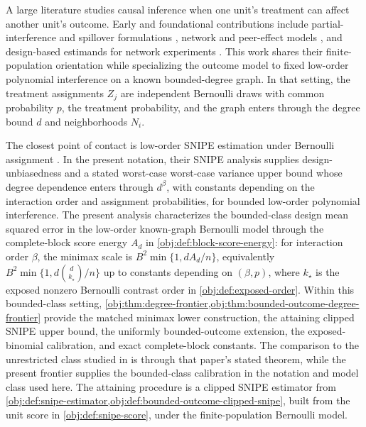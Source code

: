 \documentclass[11pt]{article}
\begin{document}
A large literature studies causal inference when one unit's treatment can affect another unit's outcome. Early and foundational contributions include partial-interference and spillover formulations \citep{Manski1993,Sobel2006,HudgensHalloran2008}, network and peer-effect models \citep{Graham2008,Bramoulle2009,TchetgenTchetgenVanderWeele2012,Manski2013}, and design-based estimands for network experiments \citep{Bowers2013,Ugander2013,vanDerLaan2014,Liu2016,Aronow2017,Eckles2017,Ogburn2017}. This work shares their finite-population orientation while specializing the outcome model to fixed low-order polynomial interference on a known bounded-degree graph. In that setting, the treatment assignments \(Z_j\) are independent Bernoulli draws with common probability \(p\), the treatment probability, and the graph enters through the degree bound \(d\) and neighborhoods \(N_i\).

The closest point of contact is low-order SNIPE estimation under Bernoulli assignment \citep{CortezRodriguezEichhornYu2023}. In the present notation, their SNIPE analysis supplies design-unbiasedness and a stated worst-case worst-case variance upper bound whose degree dependence enters through \(d^{\beta}\), with constants depending on the interaction order and assignment probabilities, for bounded low-order polynomial interference. The present analysis characterizes the bounded-class design mean squared error in the low-order known-graph Bernoulli model through the complete-block score energy \(A_d\) in \cref{obj:def:block-score-energy}: for interaction order \(\beta\), the minimax scale is \(B^2\min\{1,dA_d/n\}\), equivalently \(B^2\min\{1,d\binom d{k_\star}/n\}\) up to constants depending on \((\beta,p)\), where \(k_\star\) is the exposed nonzero Bernoulli contrast order in \cref{obj:def:exposed-order}. Within this bounded-class setting, \cref{obj:thm:degree-frontier,obj:thm:bounded-outcome-degree-frontier} provide the matched minimax lower construction, the attaining clipped SNIPE upper bound, the uniformly bounded-outcome extension, the exposed-binomial calibration, and exact complete-block constants. The comparison to the unrestricted class studied in \citet{CortezRodriguezEichhornYu2023} is through that paper's stated theorem, while the present frontier supplies the bounded-class calibration in the notation and model class used here. The attaining procedure is a clipped SNIPE estimator from \cref{obj:def:snipe-estimator,obj:def:bounded-outcome-clipped-snipe}, built from the unit score in \cref{obj:def:snipe-score}, under the finite-population Bernoulli model.
\end{document}

